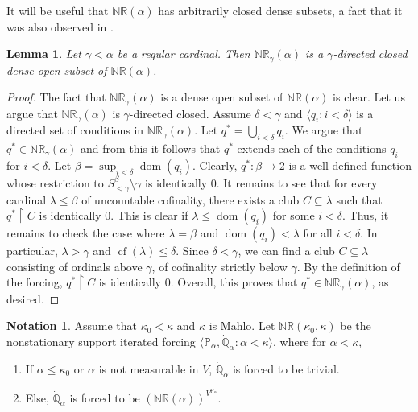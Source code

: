 \documentclass[11pt]{amsart}
\renewcommand{\restriction}{\mathbin\upharpoonright}    %
\newtheorem{lemma}[theorem]{Lemma}
\theoremstyle{definition}
\newtheorem{notation}[theorem]{Notation}
\newcounter{condition}
\theoremstyle{remark}
\newcommand\<{{<}}
\DeclareMathOperator{\cf}{cf}
\newcommand{\dom}{\mathop{\mathrm{dom}}\nolimits}
\newcommand{\po}{\mathbb{P}}
\newcommand{\qo}{\mathbb{Q}}
\newcommand{\la}{\langle}
\newcommand{\ra}{\rangle}
\begin{document}
    
    It will be useful that $\mathbb{NR}(\alpha)$ has arbitrarily closed dense subsets, a fact that it was also observed in \cite{ApterStrong}. 
   
    
    \begin{lemma}\label{Lemma: NR_gamma is gamma directed}
      Let $\gamma<\alpha$ be a regular cardinal. Then $\mathbb{NR}_{\gamma}(\alpha)$ is a  $\gamma$-directed closed dense-open subset of $\mathbb{NR}(\alpha)$.
    \end{lemma}

    \begin{proof}
        The fact that $\mathbb{NR}_\gamma(\alpha)$ is a dense open subset of $\mathbb{NR}(\alpha)$ is clear. Let us argue that $\mathbb{NR}_\gamma(\alpha)$ is $\gamma$-directed closed. Assume $\delta<\gamma$ and $\la q_i \colon i<\delta \ra$ is a directed set of conditions in $\mathbb{NR}_\gamma(\alpha)$. Let $q^* = \bigcup_{i<\delta} q_i$. We argue that $q^*\in \mathbb{NR}_{\gamma}(\alpha)$ and from this it follows that $q^*$ extends each of the conditions $q_i$ for $i<\delta$. Let $\beta= \sup_{i<\delta} \dom(q_i)$. Clearly, $q^*\colon \beta\to 2$ is a well-defined function whose restriction to $S^\beta_{< \gamma}\setminus \gamma$ is identically $0$. It remains to see that for every cardinal $\lambda\leq\beta$ of uncountable cofinality, there exists a club $C\subseteq \lambda$ such that $q^*\restriction C$ is identically $0$. This is clear if $\lambda \leq \dom(q_i)$ for some $i<\delta$. Thus, it remains to check the case where $\lambda = \beta$ and $\dom(q_i)<\lambda$ for all $i<\delta$. In particular, $\lambda>\gamma$ and $\cf(\lambda)\leq \delta$. Since $\delta<\gamma$, we can find a club  $C\subseteq \lambda$ consisting of ordinals above $\gamma$, of cofinality strictly below $\gamma$. By the definition of the forcing, $q^*\restriction C$ is identically $0$. Overall, this proves that $q^*\in \mathbb{NR}_\gamma(\alpha)$, as desired.
    \end{proof}



    \begin{notation}
        Assume that $\kappa_0 < \kappa$ and  $\kappa$ is Mahlo. Let  $\mathbb{NR}( \kappa_0, \kappa )$ be the nonstationary support iterated forcing $\la \po_\alpha, \dot{\qo}_\alpha \colon \alpha<\kappa \ra$, where for  $\alpha<\kappa$,
        \begin{enumerate}
            \item If $\alpha \leq \kappa_0$ or $\alpha$ is not measurable in $V$, $\dot{\qo}_\alpha$ is forced to be trivial.
            \item Else, $\dot{\qo}_\alpha$ is forced to be $\left(\mathbb{NR}(\alpha)\right)^{V^{\po_\alpha}}$.
        \end{enumerate}
    \end{notation}
\end{document}
